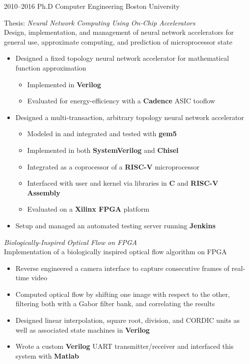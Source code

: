 \documentclass[print]{friggeri-cv} %
\begin{document}
\begin{entrylist}


\entry
{2010--2016}
{Ph.D {\normalfont Computer Engineering}}
{Boston University}
{Thesis: \emph{Neural Network Computing Using On-Chip Accelerators} \\
  Design, implementation, and management of neural network accelerators for general use, approximate computing, and prediction of microprocessor state
  \begin{itemize}
  \item Designed a fixed topology neural network accelerator for mathematical function approximation
    \begin{itemize}
    \item Implemented in \textbf{Verilog}
    \item Evaluated for energy-efficiency with a \textbf{Cadence} ASIC tooflow
    \end{itemize}
  \item Designed a multi-transaction, arbitrary topology neural network accelerator
    \begin{itemize}
    \item Modeled in \textbf{\CPP} and integrated and tested with \textbf{gem5}
    \item Implemented in both \textbf{SystemVerilog} and \textbf{Chisel}
    \item Integrated as a coprocessor of a \textbf{RISC-V} microprocessor
    \item Interfaced with user and kernel via libraries in \textbf{C} and \textbf{RISC-V Assembly}
    \item Evaluated on a \textbf{Xilinx FPGA} platform
    \end{itemize}
  \item Setup and managed an automated testing server running \textbf{Jenkins}
  \end{itemize}
  \emph{Biologically-Inspired Optical Flow on FPGA} \\
  Implementation of a biologically inspired optical flow algorithm on FPGA
  \begin{itemize}
  \item Reverse engineered a camera interface to capture consecutive frames of real-time video
  \item Computed optical flow by shifting one image with respect to the other, filtering both with a Gabor filter bank, and correlating the results
  \item Designed linear interpolation, square root, division, and CORDIC units as well as associated state machines in \textbf{Verilog}
  \item Wrote a custom \textbf{Verilog} UART transmitter/receiver and interfaced this system with \textbf{Matlab}
  \end{itemize}
}


\end{entrylist}
\end{document}
